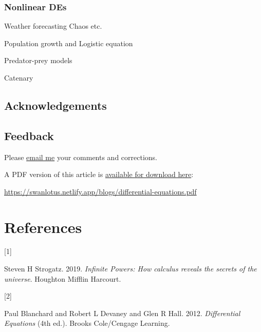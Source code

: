 \documentclass[
  a4paper,
]{article}
\newlength{\cslhangindent}
\newlength{\csllabelwidth}
\newenvironment{CSLReferences}[2] %
 {\begin{list}{}{%
  \setlength{\itemindent}{0pt}
  \setlength{\leftmargin}{0pt}
  \setlength{\parsep}{0pt}
  \ifodd #1
   \setlength{\leftmargin}{\cslhangindent}
   \setlength{\itemindent}{-1\cslhangindent}
  \fi
  \setlength{\itemsep}{#2\baselineskip}}}
 {\end{list}}
\newcommand{\CSLLeftMargin}[1]{\parbox[t]{\csllabelwidth}{\strut#1\strut}}
\newcommand{\CSLRightInline}[1]{\parbox[t]{\linewidth - \csllabelwidth}{\strut#1\strut}}
\begin{document}
\subsubsection{Nonlinear DEs}\label{nonlinear-des}

Weather forecasting Chaos etc.

Population growth and Logistic equation

Predator-prey models

Catenary

\subsection{Acknowledgements}\label{acknowledgements}

\subsection{Feedback}\label{feedback}

Please \href{mailto:feedback.swanlotus@gmail.com}{email me} your
comments and corrections.

\noindent A PDF version of this article is
\href{./differetial-equations.pdf}{available for download here}:

\begin{sffamily}

\url{https://swanlotus.netlify.app/blogs/differential-equations.pdf}

\end{sffamily}

\section*{References}\label{bibliography}

\label{refs}
\begin{CSLReferences}{0}{0}
\CSLLeftMargin{{[}1{]} }%
\CSLRightInline{Steven H Strogatz. 2019. \emph{{Infinite Powers}: {How
calculus reveals the secrets of the universe}}. Houghton Mifflin
Harcourt.}

\CSLLeftMargin{{[}2{]} }%
\CSLRightInline{Paul Blanchard and Robert L Devaney and Glen R Hall.
2012. \emph{{Differential Equations}} (4th ed.). Brooks Cole/Cengage
Learning.}

\end{CSLReferences}
\end{document}
